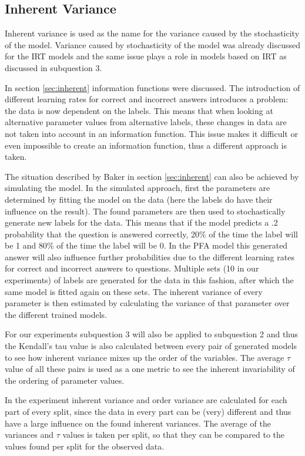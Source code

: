 \documentclass{scrartcl}
\begin{document}
\subsection{Inherent Variance}
Inherent variance is used as the name for the variance caused by the stochasticity of the model. Variance caused by stochasticity of the model was already discussed for the IRT models and the same issue plays a role in models based on IRT as discussed in subquestion 3.

In section \ref{sec:inherent} information functions were discussed. The introduction of different learning rates for correct and incorrect answers introduces a problem: the data is now dependent on the labels. This means that when looking at alternative parameter values from alternative labels, these changes in data are not taken into account in an information function. This issue makes it difficult or even impossible to create an information function, thus a different approach is taken.

The situation described by Baker in section \ref{sec:inherent} can also be achieved by simulating the model. In the simulated approach, first the parameters are determined by fitting the model on the data (here the labels do have their influence on the result). The found parameters are then used to stochastically generate new labels for the data. This means that if the model predicts a .2 probability that the question is answered correctly, 20\% of the time the label will be 1 and 80\% of the time the label will be 0. In the PFA model this generated answer will also influence further probabilities due to the different learning rates for correct and incorrect answers to questions. Multiple sets (10 in our experiments) of labels are generated for the data in this fashion, after which the same model is fitted again on these sets. The inherent variance of every parameter is then estimated by calculating the variance of that parameter over the different trained models.

For our experiments subquestion 3 will also be applied to subquestion 2 and thus the Kendall's tau value is also calculated between every pair of generated models to see how inherent variance mixes up the order of the variables. The average $\tau$ value of all these pairs is used as a one metric to see the inherent invariability of the ordering of parameter values. 

In the experiment inherent variance and order variance are calculated for each part of every split, since the data in every part can be (very) different and thus have a large influence on the found inherent variances. The average of the variances and $\tau$ values is taken per split, so that they can be compared to the values found per split for the observed data. 
\end{document}
